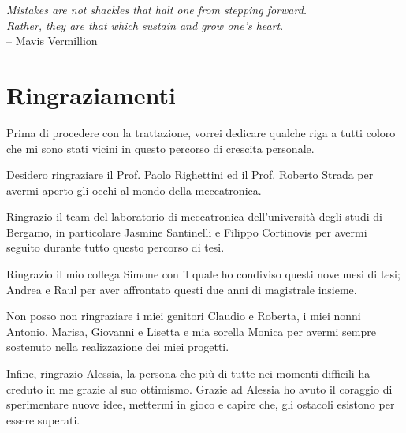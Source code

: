 \begin{flushright}

    \par   %
    \vspace{2\baselineskip}
    \textit{Mistakes are not shackles that halt one from stepping forward. \\Rather, they are that which sustain and grow one’s heart}. \\– Mavis Vermillion


\end{flushright}
\vfill
\section*{Ringraziamenti}
Prima di procedere con la trattazione, vorrei dedicare qualche riga a tutti coloro che mi sono stati vicini in questo percorso di crescita personale.
\par Desidero ringraziare il Prof. Paolo Righettini ed il Prof. Roberto Strada per avermi aperto gli occhi al mondo della meccatronica.
\par Ringrazio il team del laboratorio di meccatronica dell'università degli studi di Bergamo, in particolare Jasmine Santinelli e Filippo Cortinovis per avermi seguito durante tutto questo percorso di tesi.
\par Ringrazio il mio collega Simone con il quale ho condiviso questi nove mesi di tesi; Andrea e Raul per aver affrontato questi due anni di magistrale insieme.
\par Non posso non ringraziare i miei genitori Claudio e Roberta, i miei nonni Antonio, Marisa, Giovanni e Lisetta e mia sorella Monica per avermi sempre sostenuto nella realizzazione dei miei progetti.
\par Infine, ringrazio Alessia, la persona che più di tutte nei momenti difficili ha creduto in me grazie al suo ottimismo. Grazie ad Alessia ho avuto il coraggio di sperimentare nuove idee, mettermi in gioco e capire che, gli ostacoli esistono per essere superati.